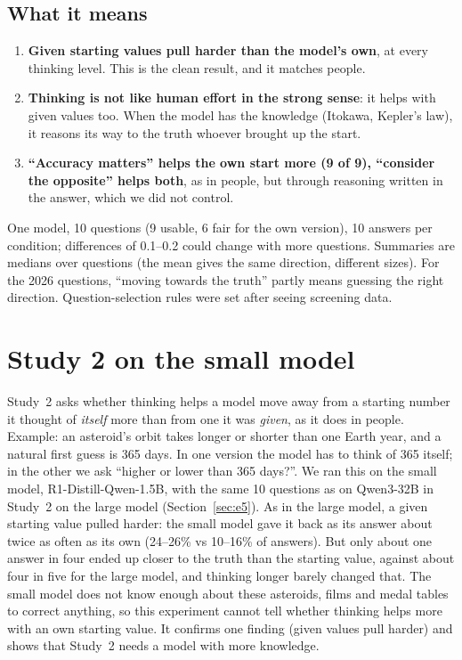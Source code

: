 \documentclass[11pt,a4paper]{article}
\begin{document}
\subsection{What it means}
\begin{enumerate}[leftmargin=*]
  \item \textbf{Given starting values pull harder than the model's own}, at every thinking level. This is the clean result, and it matches people.
  \item \textbf{Thinking is not like human effort in the strong sense}: it helps with given values too. When the model has the knowledge (Itokawa, Kepler's law), it reasons its way to the truth whoever brought up the start.
  \item \textbf{\enquote{Accuracy matters} helps the own start more (9 of 9), \enquote{consider the opposite} helps both}, as in people, but through reasoning written in the answer, which we did not control.
\end{enumerate}

\begin{cautionbox}[Limits.]
One model, 10 questions (9 usable, 6 fair for the own version), 10 answers per condition; differences of 0.1--0.2 could change with more questions. Summaries are medians over questions (the mean gives the same direction, different sizes). For the 2026 questions, \enquote{moving towards the truth} partly means guessing the right direction. Question-selection rules were set after seeing screening data.
\end{cautionbox}

\section{Study 2 on the small model}
\label{sec:e7}

\begin{inshort}
Study~2 asks whether thinking helps a model move away from a starting number it thought of \emph{itself} more than from one it was \emph{given}, as it does in people. Example: an asteroid's orbit takes longer or shorter than one Earth year, and a natural first guess is 365 days. In one version the model has to think of 365 itself; in the other we ask \enquote{higher or lower than 365 days?}. We ran this on the small model, R1-Distill-Qwen-1.5B, with the same 10 questions as on Qwen3-32B in Study~2 on the large model (Section~\ref{sec:e5}). As in the large model, a given starting value pulled harder: the small model gave it back as its answer about twice as often as its own (24--26\% vs 10--16\% of answers). But only about one answer in four ended up closer to the truth than the starting value, against about four in five for the large model, and thinking longer barely changed that. The small model does not know enough about these asteroids, films and medal tables to correct anything, so this experiment cannot tell whether thinking helps more with an own starting value. It confirms one finding (given values pull harder) and shows that Study~2 needs a model with more knowledge.
\end{inshort}
\end{document}
